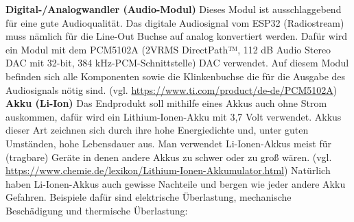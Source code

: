 \documentclass[]{article}
\begin{document}
\vspace{4mm}\newline
\textbf{Digital-/Analogwandler (Audio-Modul)}\newline
Dieses Modul ist ausschlaggebend für eine gute Audioqualität. Das digitale Audiosignal vom ESP32 (Radiostream) muss nämlich für die Line-Out Buchse auf analog konvertiert werden. Dafür wird ein Modul mit dem PCM5102A (\glqq 2VRMS DirectPath™, 112 dB Audio Stereo DAC mit 32-bit, 384 kHz-PCM-Schnittstelle\grqq{}) DAC verwendet. Auf diesem Modul befinden sich alle Komponenten sowie die Klinkenbuchse die für die Ausgabe des Audiosignals nötig sind.
\vspace{4mm} \newline
(vgl. \url{https://www.ti.com/product/de-de/PCM5102A})
\vspace{4mm}\newline
\textbf{Akku (Li-Ion)}\newline
Das Endprodukt soll mithilfe eines Akkus auch ohne Strom auskommen, dafür wird ein Lithium-Ionen-Akku mit 3,7 Volt verwendet. Akkus dieser Art zeichnen sich durch ihre hohe Energiedichte und, unter guten Umständen, hohe Lebensdauer aus. Man verwendet Li-Ionen-Akkus meist für (tragbare) Geräte in denen andere Akkus zu schwer oder zu groß wären. (vgl. \url{https://www.chemie.de/lexikon/Lithium-Ionen-Akkumulator.html}) \vspace{4mm}\newline
Natürlich haben Li-Ionen-Akkus auch gewisse Nachteile und bergen wie jeder andere Akku Gefahren. Beispiele dafür sind elektrische Überlastung, mechanische Beschädigung und thermische Überlastung:
\end{document}
